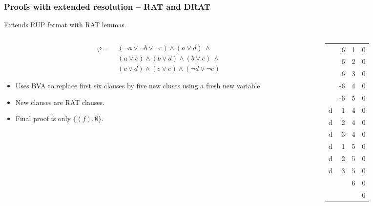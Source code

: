 \documentclass[xcolor=dvipsnames]{beamer}
\begin{document}
\begin{frame}[t]
  \frametitle{Proofs with extended resolution -- RAT and DRAT}
    Extends RUP format with RAT lemmas.
	\begin{columns}[t]
	\begin{column}{0.6\textwidth}
        \begin{align*}
            \varphi =~& (\neg a \vee \neg b \vee \neg c) \wedge (a \vee d) ~\wedge~{} \\
  					  & (a \vee e) \wedge (b \vee d) \wedge (b \vee e) ~\wedge~{} \\
                      & (c \vee d) \wedge (c \vee e) \wedge (\neg d \vee \neg e)
        \end{align*}
		\begin{itemize}
			\item Uses BVA to replace first six clauses by five new cluses using a fresh new variable
			\item New clauses are RAT clauses.
			\item Final proof is only $\{(f),\emptyset\}$.
		\end{itemize}
	\end{column}
	\begin{column}{0.4\textwidth}
		\begin{table}[]
		\begin{tabular}{rrll}
		\textbf{} & 6  & 1 & 0 \\
		\textbf{} & 6  & 2 & 0 \\
		\textbf{} & 6  & 3 & 0 \\
		\textbf{} & -6 & 4 & 0 \\
		\textbf{} & -6 & 5 & 0 \\
		d         & 1  & 4 & 0 \\
		d         & 2  & 4 & 0 \\
		d         & 3  & 4 & 0 \\
		d         & 1  & 5 & 0 \\
		d         & 2  & 5 & 0 \\
		d         & 3  & 5 & 0 \\
				  &    & 6 & 0 \\
				  &    &   & 0
		\end{tabular}
		\end{table}
	\end{column}
	\end{columns}
\end{frame}
\end{document}
